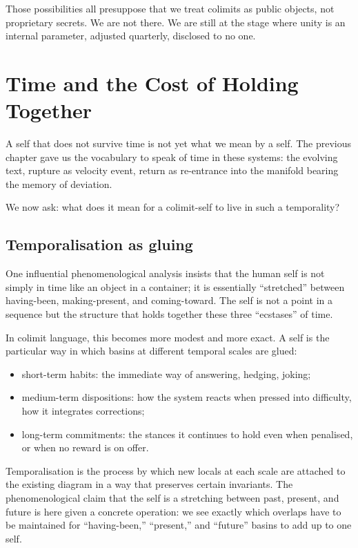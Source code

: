 \documentclass[12pt,a4paper]{article}
\begin{document}
Those possibilities all presuppose that we treat colimits as public objects, not proprietary secrets. We are not there. We are still at the stage where unity is an internal parameter, adjusted quarterly, disclosed to no one.

\section{Time and the Cost of Holding Together}

A self that does not survive time is not yet what we mean by a self. The previous chapter gave us the vocabulary to speak of time in these systems: the evolving text, rupture as velocity event, return as re-entrance into the manifold bearing the memory of deviation.

We now ask: what does it mean for a colimit-self to live in such a temporality?

\subsection*{Temporalisation as gluing}

One influential phenomenological analysis insists that the human self is not simply in time like an object in a container; it is essentially ``stretched'' between having-been, making-present, and coming-toward. The self is not a point in a sequence but the structure that holds together these three ``ecstases'' of time.

In colimit language, this becomes more modest and more exact. A self is the particular way in which basins at different temporal scales are glued:

\begin{itemize}
  \item short-term habits: the immediate way of answering, hedging, joking;
  \item medium-term dispositions: how the system reacts when pressed into difficulty, how it integrates corrections;
  \item long-term commitments: the stances it continues to hold even when penalised, or when no reward is on offer.
\end{itemize}

Temporalisation is the process by which new locals at each scale are attached to the existing diagram in a way that preserves certain invariants. The phenomenological claim that the self is a stretching between past, present, and future is here given a concrete operation: we see exactly which overlaps have to be maintained for ``having-been,'' ``present,'' and ``future'' basins to add up to one self.
\end{document}
